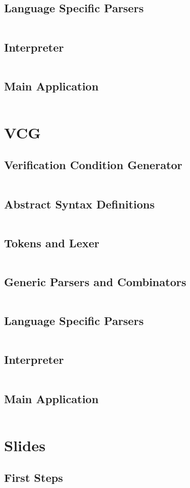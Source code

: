 \documentclass[a4paper,9pt,twoside]{book}
\newcommand{\hsfile}[1]{\inputminted[breaklines]{haskell}{../haskell/#1.hs}}
\begin{document}
\section{Language Specific Parsers}
\hsfile{interpreter/Parser2}
\section{Interpreter}
\hsfile{interpreter/Interpreter}
\section{Main Application}
\hsfile{interpreter/Main}

\chapter{VCG}
\section{Verification Condition Generator}
\hsfile{vcg/VCG}
\section{Abstract Syntax Definitions}
\hsfile{vcg/AbsSyn}
\section{Tokens and Lexer}
\hsfile{vcg/Scanner}
\section{Generic Parsers and Combinators}
\hsfile{vcg/ParserCombis}
\section{Language Specific Parsers}
\hsfile{vcg/Parser}
\section{Interpreter}
\hsfile{vcg/Interpreter}
\section{Main Application}
\hsfile{vcg/Main}

\chapter{Slides}
\section{First Steps}
\hsfile{slides/1_first_steps}
\end{document}
